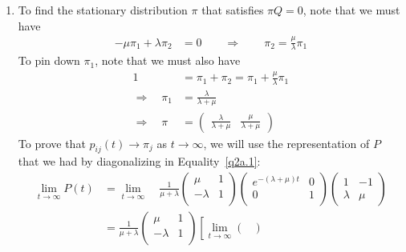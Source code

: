 \documentclass[12pt]{article}
\theoremstyle{plain}
\theoremstyle{definition}
\theoremstyle{remark}
\begin{document}
\begin{enumerate}
\begin{enumerate}
    \item %
      To find the stationary distribution $\pi$ that satisfies $\pi
      Q=0$, note that we must have
      \begin{align*}
        -\mu \pi_1 + \lambda \pi_2 &= 0
        \qquad \Rightarrow \qquad
        \pi_2 = \frac{\mu}{\lambda} \pi_1
      \end{align*}
      To pin down $\pi_1$, note that we must also have
      \begin{align*}
        1 &= \pi_1 + \pi_2
          = \pi_1 + \frac{\mu}{\lambda} \pi_1 \\
        \Rightarrow \quad \pi_1 &= \frac{\lambda}{\lambda+\mu} \\
        \Rightarrow \quad \pi &=
          \begin{pmatrix}
          \frac{\lambda}{\lambda+\mu} &
          \frac{\mu}{\lambda+\mu}
          \end{pmatrix}
      \end{align*}
      To prove that $p_{ij}(t)\rightarrow \pi_j$ as
      $t\rightarrow\infty$, we will use the representation of $P$ that
      we had by diagonalizing in Equality~\ref{q2a.1}:
      \begin{align*}
        \lim_{t\rightarrow\infty} P(t)
        &=
        \lim_{t\rightarrow\infty}
        \quad
          \frac{1}{\mu+\lambda}
          \begin{pmatrix}
            \mu & 1 \\
            -\lambda & 1 \\
          \end{pmatrix}
          \begin{pmatrix}
            e^{-(\lambda+\mu)t} & 0 \\
            0 & 1 \\
          \end{pmatrix}
          \begin{pmatrix}
            1 & -1 \\
            \lambda & \mu
          \end{pmatrix}\\
      &=
        \frac{1}{\mu+\lambda}
        \begin{pmatrix}
          \mu & 1 \\
          -\lambda & 1 \\
        \end{pmatrix}
        \left[
          \lim_{t\rightarrow\infty}
          \begin{pmatrix}

\end{pmatrix}
\end{align*}
\end{enumerate}
\end{enumerate}
\end{document}
